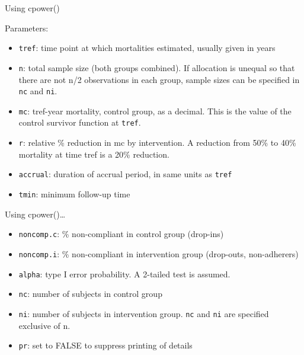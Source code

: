 \documentclass[ignorenonframetext,]{beamer}
\begin{document}
\begin{frame}{%
\protect\hypertarget{using-cpower}{%
Using cpower()}}

Parameters:

\begin{itemize}
\item
  \texttt{tref}: time point at which mortalities estimated, usually
  given in years
\item
  \texttt{n}: total sample size (both groups combined). If allocation is
  unequal so that there are not n/2 observations in each group, sample
  sizes can be specified in \texttt{nc} and \texttt{ni}.
\item
  \texttt{mc}: tref-year mortality, control group, as a decimal. This is
  the value of the control survivor function at \texttt{tref}.
\item
  \texttt{r}: relative \% reduction in mc by intervention. A reduction
  from 50\% to 40\% mortality at time tref is a 20\% reduction.
\item
  \texttt{accrual}: duration of accrual period, in same units as
  \texttt{tref}
\item
  \texttt{tmin}: minimum follow-up time
\end{itemize}

\end{frame}

\begin{frame}{%
\protect\hypertarget{using-cpower-1}{%
Using cpower()\ldots}}

\begin{itemize}
\item
  \texttt{noncomp.c}: \% non-compliant in control group (drop-ins)
\item
  \texttt{noncomp.i}: \% non-compliant in intervention group (drop-outs,
  non-adherers)
\item
  \texttt{alpha}: type I error probability. A 2-tailed test is assumed.
\item
  \texttt{nc}: number of subjects in control group
\item
  \texttt{ni}: number of subjects in intervention group. \texttt{nc} and
  \texttt{ni} are specified exclusive of n.
\item
  \texttt{pr}: set to FALSE to suppress printing of details
\end{itemize}

\end{frame}
\end{document}
